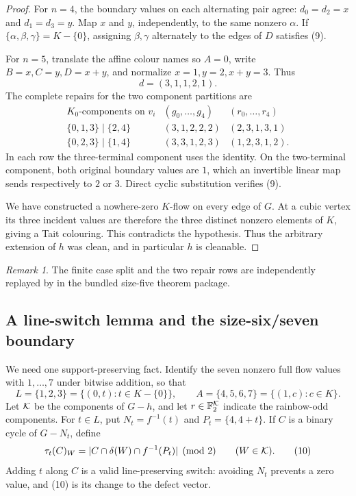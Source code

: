 \documentclass[11pt]{article}
\theoremstyle{definition}
\theoremstyle{remark}
\newtheorem{remark}[theorem]{Remark}
\newcommand{\F}{\mathbb F}
\begin{document}
\begin{proof}
For \(n=4\), the boundary values on each alternating pair agree:
\(d_0=d_2=x\) and \(d_1=d_3=y\).  Map \(x\) and \(y\), independently, to
the same nonzero \(\alpha\).  If
\(\{\alpha,\beta,\gamma\}=K-\{0\}\), assigning \(\beta,\gamma\)
alternately to the edges of \(D\) satisfies (9).

For \(n=5\), translate the affine colour names so \(A=0\), write
\(B=x,C=y,D=x+y\), and normalize \(x=1,y=2,x+y=3\).  Thus
\[
                         d=(3,1,1,2,1).
\]
The complete repairs for the two component partitions are
\[
\begin{array}{c|c|c}
K_0\text{-components on }v_i& (g_0,\ldots,g_4)&(r_0,\ldots,r_4)\\
\hline
\{0,1,3\}\mid\{2,4\}&(3,1,2,2,2)&(2,3,1,3,1)\\
\{0,2,3\}\mid\{1,4\}&(3,3,1,2,3)&(1,2,3,1,2).
\end{array}
\]
In each row the three-terminal component uses the identity.  On the
two-terminal component, both original boundary values are \(1\), which an
invertible linear map sends respectively to \(2\) or \(3\).  Direct
cyclic substitution verifies (9).

We have constructed a nowhere-zero \(K\)-flow on every edge of \(G\).
At a cubic vertex its three incident values are therefore the three
distinct nonzero elements of \(K\), giving a Tait colouring.  This
contradicts the hypothesis.  Thus the arbitrary extension of \(h\) was
clean, and in particular \(h\) is cleanable.
\end{proof}

\begin{remark}
The finite case split and the two repair rows are independently replayed
by  in the bundled size-five theorem package.
\end{remark}

\subsection{A line-switch lemma and the size-six/seven boundary}

We need one support-preserving fact.  Identify the seven nonzero full flow
values with \(1,\ldots,7\) under bitwise addition, so that
\[
 L=\{1,2,3\}=\{(0,t):t\in K-\{0\}\},\qquad
 A=\{4,5,6,7\}=\{(1,c):c\in K\}.
\]
Let \({\cal K}\) be the components of \(G-h\), and let
\(r\in\F_2^{\cal K}\) indicate the rainbow-odd components.  For
\(t\in L\), put \(N_t=f^{-1}(t)\) and \(P_t=\{4,4+t\}\).  If \(C\) is a
binary cycle of \(G-N_t\), define
\[
 \tau_t(C)_W
   =|C\cap\delta(W)\cap f^{-1}(P_t)|\pmod2
   \qquad(W\in{\cal K}).                                \tag{10}
\]
Adding \(t\) along \(C\) is a valid line-preserving switch: avoiding
\(N_t\) prevents a zero value, and (10) is its change to the defect
vector.
\end{document}
